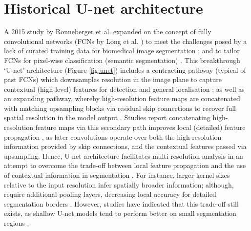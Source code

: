 

\section{Historical U-net architecture}
A 2015 study by Ronneberger et al. expanded on the concept of fully convolutional networks (FCNs by Long et al. \cite{Long2014}) to meet the challenges posed by a lack of curated training data for biomedical image segmentation \cite{Ronneberger_2015}; and to tailor FCNs for pixel-wise classification (semantic segmentation) \cite{DLINMI2018}. This breakthrough `U-net' architecture (Figure \ref{fig:unet}) includes a contracting pathway (typical of past FCNs) which downsamples resolution in the image plane to capture contextual (high-level) features for detection and general localisation \cite{Nemoto_2020}; as well as an expanding pathway, whereby high-resolution feature maps are  concatenated with matching upsampling blocks via residual skip connections \cite{Maier2019} to recover full spatial resolution in the model output \cite{DLINMI2018}. Studies report concatenating high-resolution feature maps via this secondary path improves local (detailed) feature propagation \cite{Nemoto_2020}, as later convolutions operate over both the high-resolution information provided by skip connections, and the contextual features passed via upsampling. Hence, U-net architecture facilitates multi-resolution analysis \cite{Maier2019} in an attempt to overcome the trade-off between local feature propagation and the use of contextual information in segmentation \cite{Hesamian2019}. For instance, larger kernel sizes relative to the input resolution infer spatially broader information; although, require additional pooling layers, decreasing local accuracy for detailed segmentation borders \cite{Hesamian2019}. However, studies have indicated that this trade-off still exists, as shallow U-net models tend to perform better on small segmentation regions \cite{Zhu_2018}.

